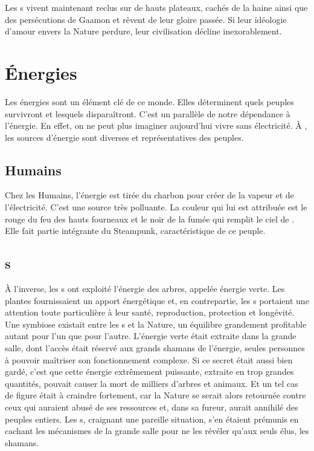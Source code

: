 Les \nomNaturels s vivent maintenant reclus sur de hauts plateaux, cachés de la haine ainsi que des persécutions de Gaamon et rêvent de leur gloire passée. Si leur idéologie d'amour envers la Nature perdure, leur civilisation décline inexorablement.



\section{Énergies}
\label{sec:energies}
Les énergies sont un élément clé de ce monde. Elles déterminent quels peuples survivront et lesquels disparaîtront. C'est un parallèle de notre dépendance à l'énergie. En effet, on ne peut plus imaginer aujourd'hui vivre sans électricité. À \nomUnivers, les sources d'énergie sont diverses et représentatives des peuples.

\subsection{Humains}
Chez les Humains, l'énergie est tirée du charbon pour créer de la vapeur et de l'électricité. C'est une source très polluante. La couleur qui lui est attribuée est le rouge du feu des hauts fourneaux et le noir de la fumée qui remplit le ciel de \nomVille. Elle fait partie intégrante du Steampunk, caractéristique de ce peuple.

\subsection{\nomNaturels s}
\label{sec:energieTelurans}
À l'inverse, les \nomNaturels s ont exploité l'énergie des arbres, appelée énergie verte. Les plantes fournissaient un apport énergétique et, en contrepartie, les \nomNaturels s portaient une attention toute particulière à leur santé, reproduction, protection et longévité. Une symbiose existait entre les \nomNaturels s et la Nature, un équilibre grandement profitable autant pour l'un que pour l'autre. L'énergie verte était extraite dans la grande salle, dont l'accès était réservé aux grands shamans de l'énergie, seules personnes à pouvoir maîtriser son fonctionnement complexe. Si ce secret était aussi bien gardé, c'est que cette énergie extrêmement puissante, extraite en trop grandes quantités, pouvait causer la mort de milliers d'arbres et animaux. Et un tel cas de figure était à craindre fortement, car la Nature se serait alors retournée contre ceux qui auraient abusé de ses ressources et, dans sa fureur, aurait annihilé des peuples entiers. Les \nomNaturels s, craignant une pareille situation, s'en étaient prémunis en cachant les mécanismes de la grande salle pour ne les révéler qu'aux seuls élus, les shamans.

